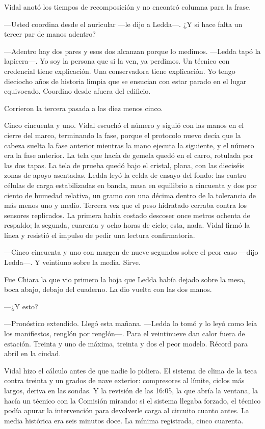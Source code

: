 Vidal anotó los tiempos de recomposición y no encontró columna para la frase.

---Usted coordina desde el auricular ---le dijo a Ledda---. ¿Y si hace falta un tercer par de manos adentro?

---Adentro hay dos pares y esos dos alcanzan porque lo medimos. ---Ledda tapó la lapicera---. Yo soy la persona que si la ven, ya perdimos. Un técnico con credencial tiene explicación. Una conservadora tiene explicación. Yo tengo dieciocho años de historia limpia que se ensucian con estar parado en el lugar equivocado. Coordino desde afuera del edificio.

Corrieron la tercera pasada a las diez menos cinco.

Cinco cincuenta y uno. Vidal escuchó el número y siguió con las manos en el cierre del marco, terminando la fase, porque el protocolo nuevo decía que la cabeza suelta la fase anterior mientras la mano ejecuta la siguiente, y el número era la fase anterior. La tela que hacía de gemela quedó en el carro, rotulada por las dos tapas. La tela de prueba quedó bajo el cristal, plana, con las dieciséis zonas de apoyo asentadas. Ledda leyó la celda de ensayo del fondo: las cuatro células de carga estabilizadas en banda, masa en equilibrio a cincuenta y dos por ciento de humedad relativa, un gramo con una décima dentro de la tolerancia de más menos uno y medio. Tercera vez que el peso hidratado cerraba contra los sensores replicados. La primera había costado descoser once metros ochenta de respaldo; la segunda, cuarenta y ocho horas de ciclo; esta, nada. Vidal firmó la línea y resistió el impulso de pedir una lectura confirmatoria.

---Cinco cincuenta y uno con margen de nueve segundos sobre el peor caso ---dijo Ledda---. Y veintiuno sobre la media. Sirve.

Fue Chiara la que vio primero la hoja que Ledda había dejado sobre la mesa, boca abajo, debajo del cuaderno. La dio vuelta con las dos manos.

---¿Y esto?

---Pronóstico extendido. Llegó esta mañana. ---Ledda lo tomó y lo leyó como leía los manifiestos, renglón por renglón---. Para el veintinueve dan calor fuera de estación. Treinta y uno de máxima, treinta y dos el peor modelo. Récord para abril en la ciudad.

Vidal hizo el cálculo antes de que nadie lo pidiera. El sistema de clima de la teca contra treinta y un grados de nave exterior: compresores al límite, ciclos más largos, deriva en las sondas. Y la revisión de las 16:05, la que abría la ventana, la hacía un técnico con la Comisión mirando: si el sistema llegaba forzado, el técnico podía apurar la intervención para devolverle carga al circuito cuanto antes. La media histórica era seis minutos doce. La mínima registrada, cinco cuarenta.

